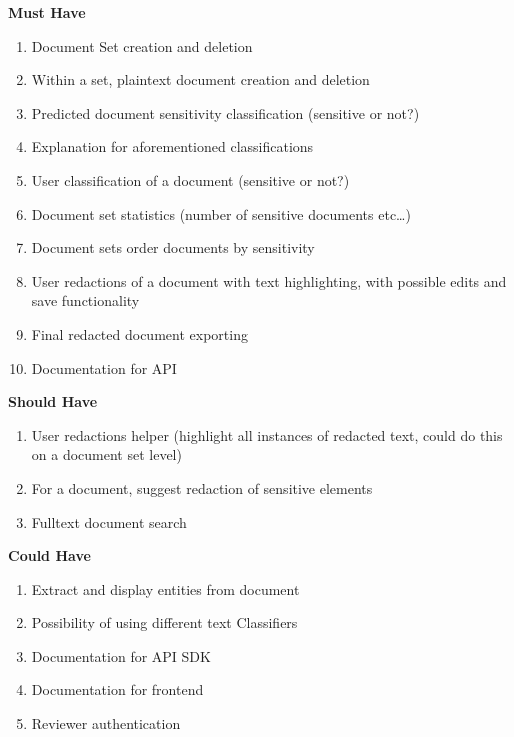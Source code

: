 \documentclass[\version]{l4proj}
\begin{document}
\begin{adjustbox}{width=0.9\textwidth,center}
    \begin{minipage}[t]{.5\linewidth}
        \centerline{\textbf{Must Have}}
        \begin{enumerate}[noitemsep,nolistsep,label=\textbf{M\arabic*}]
            \item Document Set creation and deletion
            \item Within a set, plaintext document creation and deletion
            \item Predicted document sensitivity classification (sensitive or not?)
            \item Explanation for aforementioned classifications
            \item User classification of a document (sensitive or not?)
            \item Document set statistics (number of sensitive documents etc\ldots)
            \item Document sets order documents by sensitivity
            \item User redactions of a document with text highlighting, with possible edits and save functionality
            \item Final redacted document exporting
            \item Documentation for API
        \end{enumerate}
    \end{minipage}
    \hfill
    \noindent
    \begin{minipage}[t]{.5\linewidth}
        \centerline{\textbf{Should Have}}
        \begin{enumerate}[noitemsep,nolistsep,label=\textbf{S\arabic*}]
            \item User redactions helper (highlight all instances of redacted text, could do this on a document set level)
            \item For a document, suggest redaction of sensitive elements
            \item Fulltext document search
        \end{enumerate}
        \vspace{0.5cm}
        \centerline{\textbf{Could Have}}
        \begin{enumerate}[noitemsep,nolistsep,label=\textbf{C\arabic*}]
            \item Extract and display entities from document
            \item Possibility of using different text Classifiers
            \item Documentation for API SDK
            \item Documentation for frontend
            \item Reviewer authentication
        \end{enumerate}
    \end{minipage}
\end{adjustbox}
\end{document}
